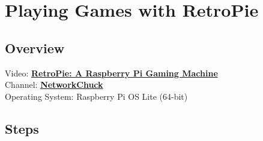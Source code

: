 \section{Playing Games with RetroPie}

\subsection{Overview}
Video: \href{https://www.youtube.com/watch?v=AaseHnf0k2o}{\textbf{\color{blue}RetroPie: A Raspberry Pi Gaming Machine}} \\
Channel: \href{https://www.youtube.com/@NetworkChuck}{\textbf{\color{blue}NetworkChuck}} \\
Operating System: Raspberry Pi OS Lite (64-bit)

\subsection{Steps}

